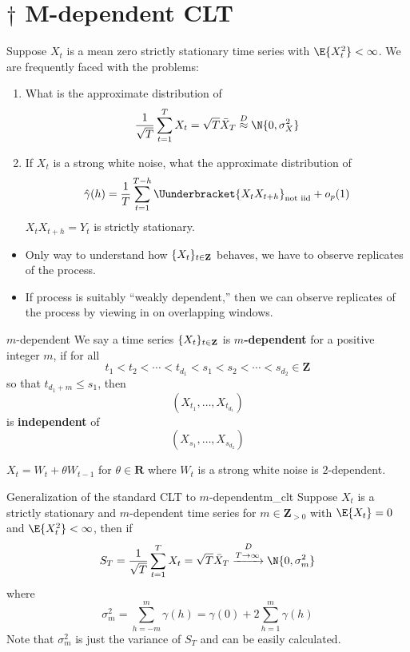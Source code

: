 \section{\texorpdfstring{$ \dagger $}{†} M-dependent CLT}
Suppose $ X_t $ is a mean zero strictly stationary time series
with $ \E{X_t^2}<\infty $. We are frequently faced
with the problems:
\begin{enumerate}[(1)]
    \item What is the approximate distribution of
          \[ \frac{1}{\sqrt{T}} \sum_{t=1}^{T} X_t=\sqrt{T}\bar{X}_T\stackrel{D}{\approx}\N{0,\sigma_X^2} \]
    \item If $ X_t $ is a strong white noise, what the approximate distribution of
          \[ \hat{\gamma}(h)=\frac{1}{T} \sum_{t=1}^{T-h}\Uunderbracket{X_t X_{t+h}}_{\text{not iid}}+o_p(1) \]
          $ X_t X_{t+h}=Y_{t} $ is strictly stationary.
\end{enumerate}
\begin{itemize}
    \item Only way to understand how $ \{X_t\}_{t\in\mathbf{Z}} $ behaves,
          we have to observe replicates of the process.
    \item If process is suitably ``weakly dependent,'' then we can observe
          replicates of the process by viewing in on overlapping windows.
\end{itemize}
\begin{Definition}{$ m $-dependent}{}
    We say a time series $ \{X_t\}_{t\in\mathbf{Z}} $ is $ m $\textbf{-dependent}
    for a positive integer $ m $, if for all
    \[ t_1<t_2<\cdots<t_{d_1}<s_1<s_2<\cdots<s_{d_2}\in\mathbf{Z} \]
    so that $ t_{d_1+m}\le s_1 $, then
    \[ (X_{t_1},\ldots,X_{t_{d_1}}) \]
    is \textbf{independent} of
    \[ (X_{s_1},\ldots,X_{s_{d_2}}) \]
\end{Definition}
\begin{Example}{}{}
    $ X_t=W_{t}+\theta W_{t-1} $ for $ \theta\in\mathbf{R} $
    where $ W_{t} $ is a strong white noise is $ 2 $-dependent.
\end{Example}
\begin{Theorem}{Generalization of the standard CLT to $ m $-dependent}{m_clt}
    Suppose $ X_t $ is a strictly stationary
    and $ m $-dependent time series for $ m\in\mathbf{Z}_{>0} $
    with $ \E{X_t}=0 $ and $ \E{X_t^2}<\infty $, then if
    \[ S_T=\frac{1}{\sqrt{T}} \sum_{t=1}^{T}X_t=\sqrt{T}\bar{X}_T
        \stackrel{D}{\xrightarrow{T\to\infty}}\N{0,\sigma_m^2}  \]
    where
    \[ \sigma_m^2=\sum_{h=-m}^{m} \gamma(h)=\gamma(0)+2 \sum_{h=1}^{m} \gamma(h) \]
    Note that $ \sigma_m^2 $ is just the variance of $ S_T $
    and can be easily calculated.
\end{Theorem}
